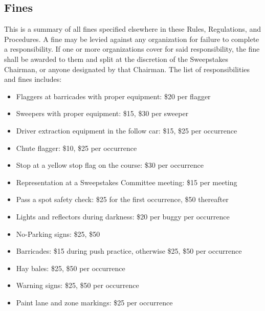 \begin{appendices}
	\section{Fines}
		This is a summary of all fines specified elsewhere in these Rules, Regulations, 
		and Procedures. A fine may be levied against any organization for failure to complete
		a responsibility. If one or more organizations cover for said responsibility, the fine
		shall be awarded to them and split at the discretion of the Sweepstakes Chairman, or 
		anyone designated by that Chairman. The list of responsibilities and fines includes:

		\begin{itemize}

			\item Flaggers at barricades with proper equipment: \$20 per flagger
			
			\item Sweepers with proper equipment: \$15, \$30 per sweeper
			
			\item Driver extraction equipment in the follow car: \$15, \$25 per occurrence
			
			\item Chute flagger: \$10, \$25 per occurrence
			
			\item Stop at a yellow stop flag on the course: \$30 per occurrence

			\item Representation at a Sweepstakes Committee meeting: \$15 per meeting

			\item Pass a spot safety check: \$25 for the first occurrence, \$50 thereafter
			
			\item Lights and reflectors during darkness: \$20 per buggy per occurrence

			\item No-Parking signs: \$25, \$50
			
			\item Barricades: \$15 during push practice, otherwise \$25, \$50 per occurrence

			\item Hay bales: \$25, \$50 per occurrence
			
			\item Warning signs: \$25, \$50 per occurrence

			\item Paint lane and zone markings: \$25 per occurrence


\end{itemize}
\end{appendices}
